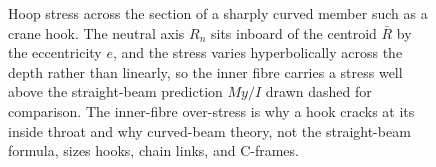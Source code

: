 \begin{figure}[htbp]
\caption[Stress across a curved-beam section]{Hoop stress across the
section of a sharply curved member such as a crane hook. The neutral axis
$R_n$ sits inboard of the centroid $\bar{R}$ by the eccentricity $e$,
and the stress varies hyperbolically across the depth rather than
linearly, so the inner fibre carries a stress well above the straight-beam
prediction $My/I$ drawn dashed for comparison. The inner-fibre
over-stress is why a hook cracks at its inside throat and why curved-beam
theory, not the straight-beam formula, sizes hooks, chain links, and
C-frames.}
\label{fig:vol03ch03:curved-beam-stress}
\end{figure}

